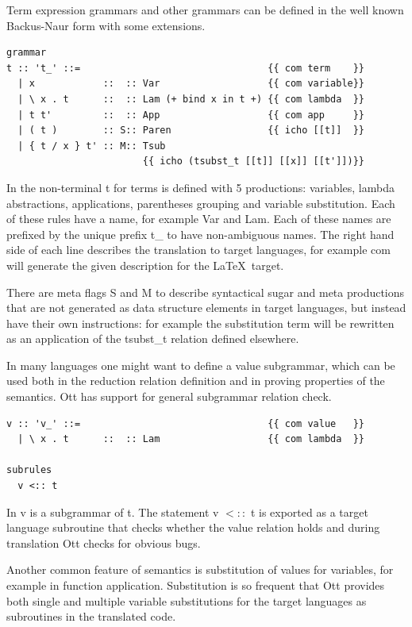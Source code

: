 \documentclass[12pt,twoside,notitlepage]{report}
\begin{document}
Term expression grammars and other grammars can be defined in the well known Backus-Naur form with some extensions.

\begin{lstlisting}[language={Ott}, caption={Ott grammar example}, label={lst:ottgrammarex}]
grammar
t :: 't_' ::=                                 {{ com term    }}
  | x            ::  :: Var                   {{ com variable}}
  | \ x . t      ::  :: Lam (+ bind x in t +) {{ com lambda  }}
  | t t'         ::  :: App                   {{ com app     }}
  | ( t )        :: S:: Paren                 {{ icho [[t]]  }} 
  | { t / x } t' :: M:: Tsub  
                        {{ icho (tsubst_t [[t]] [[x]] [[t']])}}
\end{lstlisting}

In  the non-terminal t for terms is defined with 5 productions: variables, lambda abstractions, applications, parentheses grouping and variable substitution. Each of these rules have a name, for example Var and Lam. Each of these names are prefixed by the unique prefix t\_ to have non-ambiguous names. The right hand side of each line describes the translation to target languages, for example com will  generate the given description for the \LaTeX\, target. 

There are meta flags S and M to describe syntactical sugar and meta productions that are not generated as data structure elements in target languages, but instead have their own instructions: for example the substitution term will be rewritten as an application of the tsubst\_t relation defined elsewhere. 

In many languages one might want to define a value subgrammar, which can be used both in the reduction relation definition and in proving properties of the semantics. Ott has support for general subgrammar relation check.
\begin{lstlisting}[language={Ott}, caption={Ott value subgrammar example}, label={lst:ottvaluesubgrammarexample}]
v :: 'v_' ::=                                 {{ com value   }}
  | \ x . t      ::  :: Lam                   {{ com lambda  }}
  
subrules
  v <:: t
\end{lstlisting}
In  v is a subgrammar of t. The statement v $<::$ t is exported as a target language subroutine that checks whether the value relation holds and during translation Ott checks for obvious bugs.

Another common feature of semantics is substitution of values for variables, for example in function application. Substitution is so frequent that Ott provides both single and multiple variable substitutions for the target languages as subroutines in the translated code.
\end{document}
